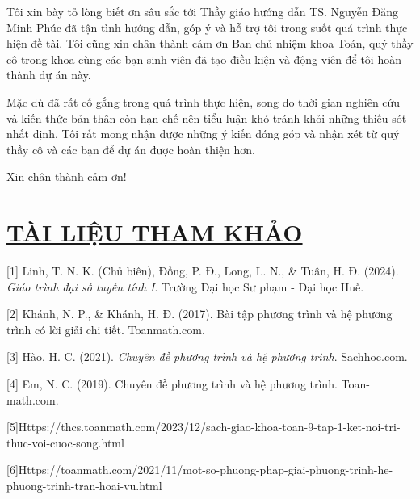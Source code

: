 \documentclass[12pt,a4paper,oneside]{book}
\theoremstyle{theorem}
\theoremstyle{definition}
\begin{document}
Tôi xin bày tỏ lòng biết ơn sâu sắc tới Thầy giáo hướng dẫn TS. Nguyễn Đăng Minh Phúc đã tận tình hướng dẫn, góp ý và hỗ trợ tôi trong suốt quá trình thực hiện
đề tài. Tôi cũng xin chân thành cảm ơn Ban chủ nhiệm khoa Toán, quý thầy cô
trong khoa cùng các bạn sinh viên đã tạo điều kiện và động viên để tôi hoàn
thành dự án này.

Mặc dù đã rất cố gắng trong quá trình thực hiện, song do thời gian nghiên
cứu và kiến thức bản thân còn hạn chế nên tiểu luận khó tránh khỏi những thiếu
sót nhất định. Tôi rất mong nhận được những ý kiến đóng góp và nhận xét từ
quý thầy cô và các bạn để dự án được hoàn thiện hơn.

Xin chân thành cảm ơn!
\chapter*{\underline{TÀI LIỆU THAM KHẢO}}
 [1] Linh, T. N. K. (Chủ biên), Đồng, P. Đ., Long, L. N., \& Tuân, H. Đ. (2024). \textit{Giáo trình đại số tuyến tính I}. Trường Đại học Sư phạm - Đại học Huế.
 
 [2] Khánh, N. P., \& Khánh, H. Đ. (2017). Bài tập phương trình và hệ phương trình có lời giải chi tiết. Toanmath.com.
 
[3] Hào, H. C. (2021). \textit{Chuyên đề phương trình và hệ phương trình}. Sachhoc.com.

[4] Em, N. C. (2019). Chuyên đề phương trình và hệ phương trình. Toan-
math.com.

[5]Https://thcs.toanmath.com/2023/12/sach-giao-khoa-toan-9-tap-1-ket-noi-tri-thuc-voi-cuoc-song.html

[6]Https://toanmath.com/2021/11/mot-so-phuong-phap-giai-phuong-trinh-he-phuong-trinh-tran-hoai-vu.html
\end{document}

